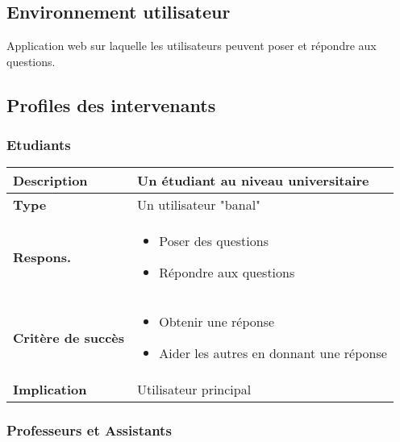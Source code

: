 \newpage

\subsection{Environnement utilisateur}

Application web sur laquelle les utilisateurs peuvent poser et répondre aux questions.

\subsection{Profiles des intervenants}
\subsubsection{Etudiants}

\begin{center}

\begin{tabular}{| >{\bfseries} M{85pt} | M{250pt} |}
	\hline
	Description & Un étudiant au niveau universitaire \tabularnewline
	\hline
	Type & Un utilisateur "banal" \tabularnewline
	\hline
	Respons. &
	\begin{itemize}
		\item Poser des questions
		\item Répondre aux questions
	\end{itemize} \tabularnewline
	\hline
	Critère de succès &
	\begin{itemize}
		\item Obtenir une réponse
		\item Aider les autres en donnant une réponse
	\end{itemize} \tabularnewline
	\hline
	Implication & Utilisateur principal \tabularnewline
	\hline

\end{tabular}

\end{center}

\subsubsection{Professeurs et Assistants}

